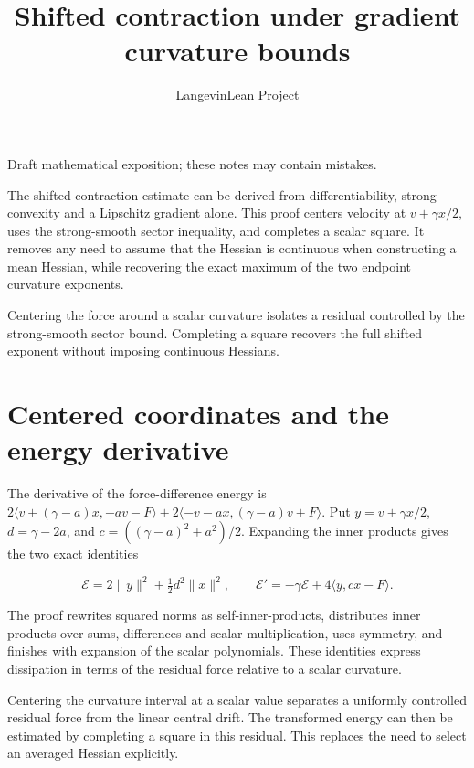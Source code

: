 \documentclass[11pt,a4paper]{article}
\title{\texorpdfstring{Shifted contraction under gradient curvature bounds}{Shifted contraction under gradient curvature bounds}}
\author{LangevinLean Project}
\date{}
\begin{document}
\maketitle
Draft mathematical exposition; these notes may contain mistakes.


The shifted contraction estimate can be derived from differentiability, strong convexity and a Lipschitz gradient alone. This proof centers velocity at \(v+\gamma x/2\), uses the strong-smooth sector inequality, and completes a scalar square. It removes any need to assume that the Hessian is continuous when constructing a mean Hessian, while recovering the exact maximum of the two endpoint curvature exponents.



Centering the force around a scalar curvature isolates a residual controlled by the strong-smooth sector bound. Completing a square recovers the full shifted exponent without imposing continuous Hessians.


\section{\texorpdfstring{Centered coordinates and the energy derivative}{Centered coordinates and the energy derivative}}


The derivative of the force-difference energy is \(2\langle v+(\gamma-a)x,-av-F\rangle+2\langle-v-ax,(\gamma-a)v+F\rangle\). Put \(y=v+\gamma x/2\), \(d=\gamma-2a\), and \(c=((\gamma-a)^2+a^2)/2\). Expanding the inner products gives the two exact identities

\[\mathcal E=2\|y\|^2+\tfrac12d^2\|x\|^2,\qquad \mathcal E'=-\gamma\mathcal E+4\langle y,cx-F\rangle.\]

The proof rewrites squared norms as self-inner-products, distributes inner products over sums, differences and scalar multiplication, uses symmetry, and finishes with expansion of the scalar polynomials. These identities express dissipation in terms of the residual force relative to a scalar curvature.



Centering the curvature interval at a scalar value separates a uniformly controlled residual force from the linear central drift. The transformed energy can then be estimated by completing a square in this residual. This replaces the need to select an averaged Hessian explicitly.
\end{document}
